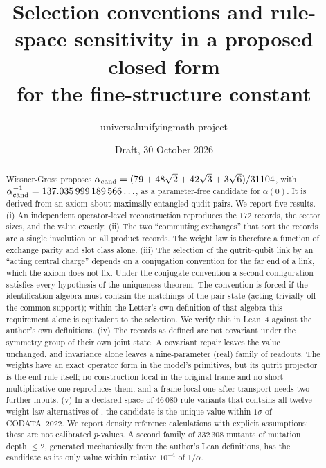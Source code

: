 \documentclass[11pt]{article}
\title{Selection conventions and rule-space sensitivity in a proposed closed form\\ for the fine-structure constant}
\author{universalunifyingmath project}
\date{Draft, 30 October 2026}
\theoremstyle{remark}
\begin{document}
\maketitle

\begin{abstract}
Wissner-Gross \cite{wg} proposes
$\alpha_{\rm cand}=(79+48\sqrt2+42\sqrt3+3\sqrt6)/31104$, with $\alpha_{\rm cand}^{-1}=137.035\,999\,189\,566\ldots$, as a parameter-free candidate for $\alpha(0)$. It is derived from an axiom about maximally entangled qudit pairs. We report five results.
(i) An independent operator-level reconstruction reproduces the $172$ records, the sector sizes, and the value exactly.
(ii) The two ``commuting exchanges'' that sort the records are a single involution on all product records. The weight law is therefore a function of exchange parity and slot class alone.
(iii) The selection of the qutrit--qubit link by an ``acting central charge'' depends on a conjugation convention for the far end of a link, which the axiom does not fix. Under the conjugate convention a second configuration satisfies every hypothesis of the uniqueness theorem. The convention is forced if the identification algebra must contain the matchings of the pair state (acting trivially off the common support); within the Letter's own definition of that algebra this requirement alone is equivalent to the selection. We verify this in Lean~4 against the author's own definitions.
(iv) The records as defined are not covariant under the symmetry group of their own joint state. A covariant repair leaves the value unchanged, and invariance alone leaves a nine-parameter (real) family of readouts. The weights have an exact operator form in the model's primitives, but its qutrit projector is the end rule itself; no construction local in the original frame and no short multiplicative one reproduces them, and a frame-local one after transport needs two further inputs.
(v) In a declared space of $46\,080$ rule variants that contains all twelve weight-law alternatives of \cite[Table S5]{wg}, the candidate is the unique value within $1\sigma$ of CODATA~2022. We report density reference calculations with explicit assumptions; these are not calibrated $p$-values. A second family of $332\,308$ mutants of mutation depth $\le2$, generated mechanically from the author's Lean definitions, has the candidate as its only value within relative $10^{-4}$ of $1/\alpha$.
\end{abstract}
\end{document}

